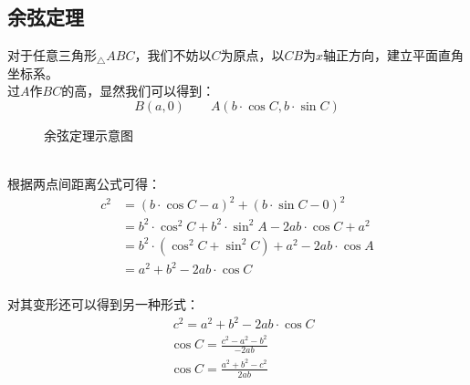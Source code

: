 \documentclass[UTF8]{ctexart}
\begin{document}
\subsection{余弦定理}
    对于任意三角形$_\triangle ABC$，我们不妨以$C$为原点，以$CB$为$x$轴正方向，建立平面直角坐标系。\\[3mm]
    过$A$作$BC$的高，显然我们可以得到：
    \setcounter{equation}{0}
    \begin{equation}
        B(a,0)\qquad A(b\cdot\cos{C},b\cdot\sin{C})
    \end{equation}
    \begin{figure}[h]
        \begin{center}
            \caption{余弦定理示意图}
        \end{center}
    \end{figure}\\
    根据两点间距离公式可得：\vspace{5pt}
    \begin{align}
        c^2
        &=(b\cdot\cos{C}-a)^2+(b\cdot\sin{C}-0)^2\\[3mm]
        &=b^2\cdot\cos^2{C}+b^2\cdot\sin^2{A}-2ab\cdot\cos{C}+a^2\\[3mm]
        &=b^2\cdot\left(\cos^2{C}+\sin^2{C}\right)+a^2-2ab\cdot\cos{A}\\[3mm]
        &=a^2+b^2-2ab\cdot\cos{C}
    \end{align}\\
    对其变形还可以得到另一种形式：
    \begin{align}
        &~c^2=a^2+b^2-2ab\cdot\cos{C}\\[3mm]
        &\cos{C}=\frac{c^2-a^2-b^2}{-2ab}\\[3mm]
        &\cos{C}=\frac{a^2+b^2-c^2}{2ab}
    \end{align}\\
\end{document}
